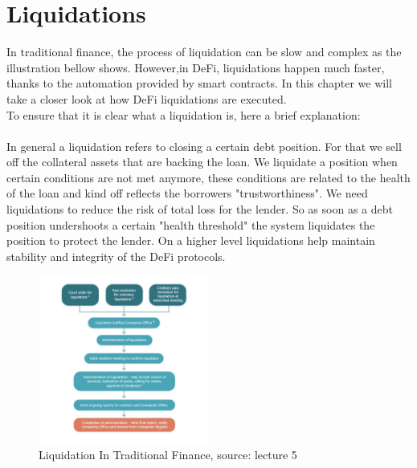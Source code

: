 \documentclass{article}
\begin{document}
\section{Liquidations}
In traditional finance, the process of liquidation can be slow and complex as the illustration bellow shows. However,in DeFi, liquidations happen much faster, thanks to the automation provided by smart contracts. In this chapter we will take a closer look at how DeFi liquidations are executed.\\To ensure that it is clear what a liquidation is, here a brief explanation:\\\\ In general a liquidation refers to closing a certain debt position. For that we sell off the collateral assets that are backing the loan. We liquidate a position when certain conditions are not met anymore, these conditions are related to the health of the loan and kind off reflects the borrowers "trustworthiness". We need liquidations to reduce the risk of total loss for the lender. So as soon as a debt position undershoots a certain "health threshold" the system liquidates the position to protect the lender. On a higher level liquidations help maintain stability and integrity of the DeFi protocols.\\

\begin{figure}[h]
    \centering
    \includegraphics[width=0.5\textwidth]{Bildschirmfoto 2024-04-06 um 23.43.54.png} 
    \caption{Liquidation In Traditional Finance, \scriptsize{source: lecture 5}}
    \label{fig:DoS-attack}
\end{figure}
\end{document}
